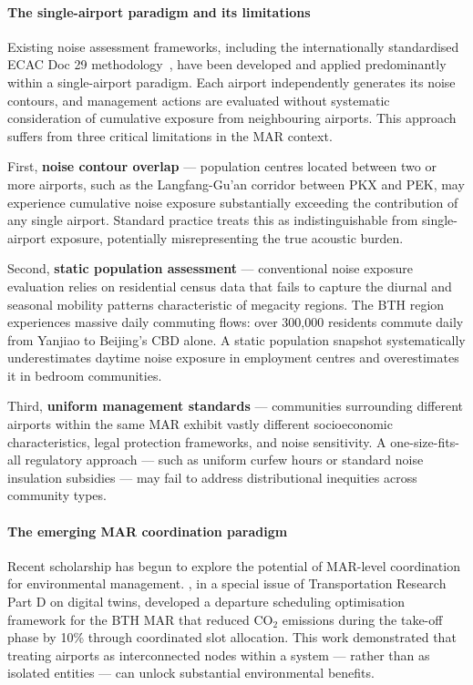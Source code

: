 \documentclass[review,12pt]{elsarticle}
\begin{document}
\paragraph{The single-airport paradigm and its limitations}

Existing noise assessment frameworks, including the internationally standardised ECAC Doc 29 methodology~\citep{ecac2016ceac}, have been developed and applied predominantly within a single-airport paradigm. Each airport independently generates its noise contours, and management actions are evaluated without systematic consideration of cumulative exposure from neighbouring airports. This approach suffers from three critical limitations in the MAR context.

First, \textbf{noise contour overlap} --- population centres located between two or more airports, such as the Langfang-Gu'an corridor between PKX and PEK, may experience cumulative noise exposure substantially exceeding the contribution of any single airport. Standard practice treats this as indistinguishable from single-airport exposure, potentially misrepresenting the true acoustic burden.

Second, \textbf{static population assessment} --- conventional noise exposure evaluation relies on residential census data that fails to capture the diurnal and seasonal mobility patterns characteristic of megacity regions. The BTH region experiences massive daily commuting flows: over 300,000 residents commute daily from Yanjiao to Beijing's CBD alone. A static population snapshot systematically underestimates daytime noise exposure in employment centres and overestimates it in bedroom communities.

Third, \textbf{uniform management standards} --- communities surrounding different airports within the same MAR exhibit vastly different socioeconomic characteristics, legal protection frameworks, and noise sensitivity. A one-size-fits-all regulatory approach --- such as uniform curfew hours or standard noise insulation subsidies --- may fail to address distributional inequities across community types.

\paragraph{The emerging MAR coordination paradigm}

Recent scholarship has begun to explore the potential of MAR-level coordination for environmental management. \citet{xu2025flight}, in a special issue of Transportation Research Part D on digital twins, developed a departure scheduling optimisation framework for the BTH MAR that reduced CO$_2$ emissions during the take-off phase by 10\% through coordinated slot allocation. This work demonstrated that treating airports as interconnected nodes within a system --- rather than as isolated entities --- can unlock substantial environmental benefits.
\end{document}

